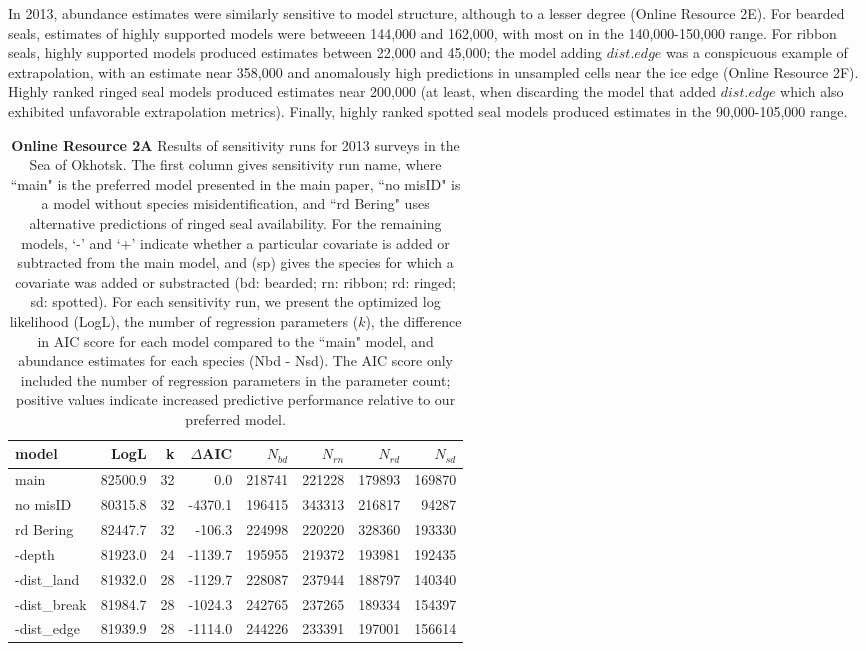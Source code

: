 \documentclass{svjour3}
\begin{document}
In 2013, abundance estimates were similarly sensitive to model structure, although to a lesser degree (Online Resource 2E).  For bearded seals, estimates of highly supported models were betweeen 144,000 and 162,000, with most on in the 140,000-150,000 range.  For ribbon seals, highly supported models produced estimates between 22,000 and 45,000; the model adding $dist.edge$ was a conspicuous example of extrapolation, with an estimate near 358,000 and anomalously high predictions in unsampled cells near the ice edge (Online Resource 2F).  Highly ranked ringed seal models produced estimates near 200,000 (at least, when discarding the model that added $dist.edge$ which also exhibited unfavorable extrapolation metrics).  Finally, highly ranked spotted seal models produced estimates in the 90,000-105,000 range.








\begin{table}[htbp]
\centering
\caption{\textbf{Online Resource 2A} Results of sensitivity runs for 2013 surveys in the Sea of Okhotsk. The first column gives sensitivity run name, where ``main" is the preferred model presented in the main paper, ``no misID" is a model without species misidentification, and ``rd Bering" uses alternative predictions of ringed seal availability.  For the remaining models,  `-' and `+' indicate whether a particular covariate is added or subtracted from the main model, and (sp) gives the species for which a covariate was added or substracted (bd: bearded; rn: ribbon; rd: ringed; sd: spotted).  For each sensitivity run, we present the optimized log likelihood (LogL), the number of regression parameters ($k$), the difference in AIC score for each model compared to the ``main" model, and abundance estimates for each species (Nbd - Nsd).  The AIC score only included the number of regression parameters in the parameter count; positive values indicate increased predictive performance relative to our preferred model.}
\begin{tabular}{lrrrrrrr}
  \hline
model & LogL & k & $\Delta$AIC & $N_{bd}$ & $N_{rn}$ & $N_{rd}$ & $N_{sd}$ \\
  \hline
main & 82500.9 & 32 & 0.0 & 218741 & 221228 & 179893 & 169870 \\
  no misID & 80315.8 & 32 & -4370.1 & 196415 & 343313 & 216817 & 94287 \\
  rd Bering & 82447.7 & 32 & -106.3 & 224998 & 220220 & 328360 & 193330 \\
  -depth & 81923.0 & 24 & -1139.7 & 195955 & 219372 & 193981 & 192435 \\
  -dist\_land & 81932.0 & 28 & -1129.7 & 228087 & 237944 & 188797 & 140340 \\
  -dist\_break & 81984.7 & 28 & -1024.3 & 242765 & 237265 & 189334 & 154397 \\
  -dist\_edge & 81939.9 & 28 & -1114.0 & 244226 & 233391 & 197001 & 156614 \\
   \hline
\end{tabular}
\label{tab:sensOkhotsk}
\end{table}
\end{document}
